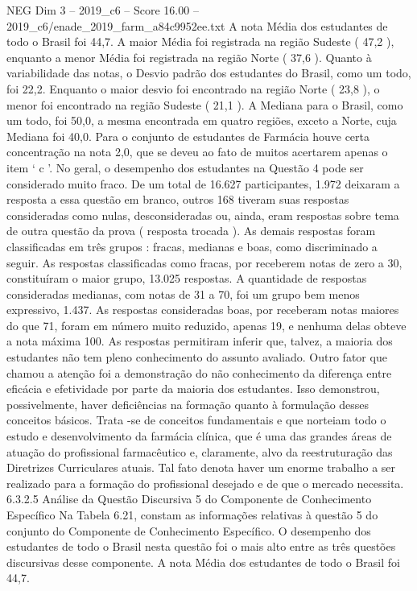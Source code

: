 \begin{textsample}{NEG Dim 3 – 2019\_c6 – Score 16.00 – 2019\_c6/enade\_2019\_farm\_a84c9952ee.txt}
A nota Média dos estudantes de todo o Brasil foi 44,7.
A maior Média foi registrada na região Sudeste ( 47,2 ), enquanto a menor Média foi registrada na região Norte ( 37,6 ).
Quanto à variabilidade das notas, o Desvio padrão dos estudantes do Brasil, como um todo, foi 22,2.
Enquanto o maior desvio foi encontrado na região Norte ( 23,8 ), o menor foi encontrado na região Sudeste ( 21,1 ).
A Mediana para o Brasil, como um todo, foi 50,0, a mesma encontrada em quatro regiões, exceto a Norte, cuja Mediana foi 40,0.
Para o conjunto de estudantes de Farmácia houve certa concentração na nota 2,0, que se deveu ao fato de muitos acertarem apenas o item ‘ c ’.
No geral, o desempenho dos estudantes na Questão 4 pode ser considerado muito fraco.
De um total de 16.627 participantes, 1.972 deixaram a resposta a essa questão em branco, outros 168 tiveram suas respostas consideradas como nulas, desconsideradas ou, ainda, eram respostas sobre tema de outra questão da prova ( resposta trocada ).
As demais respostas foram classificadas em três grupos : fracas, medianas e boas, como discriminado a seguir.
As respostas classificadas como fracas, por receberem notas de zero a 30, constituíram o maior grupo, 13.025 respostas.
A quantidade de respostas consideradas medianas, com notas de 31 a 70, foi um grupo bem menos expressivo, 1.437.
As respostas consideradas boas, por receberam notas maiores do que 71, foram em número muito reduzido, apenas 19, e nenhuma delas obteve a nota máxima 100.
As respostas permitiram inferir que, talvez, a maioria dos estudantes não tem pleno conhecimento do assunto avaliado.
Outro fator que chamou a atenção foi a demonstração do não conhecimento da diferença entre eficácia e efetividade por parte da maioria dos estudantes.
Isso demonstrou, possivelmente, haver deficiências na formação quanto à formulação desses conceitos básicos.
Trata -se de conceitos fundamentais e que norteiam todo o estudo e desenvolvimento da farmácia clínica, que é uma das grandes áreas de atuação do profissional farmacêutico e, claramente, alvo da reestruturação das Diretrizes Curriculares atuais.
Tal fato denota haver um enorme trabalho a ser realizado para a formação do profissional desejado e de que o mercado necessita. 6.3.2.5 Análise da Questão Discursiva 5 do Componente de Conhecimento Específico Na Tabela 6.21, constam as informações relativas à questão 5 do conjunto do Componente de Conhecimento Específico.
O desempenho dos estudantes de todo o Brasil nesta questão foi o mais alto entre as três questões discursivas desse componente.
A nota Média dos estudantes de todo o Brasil foi 44,7.

\end{textsample}
